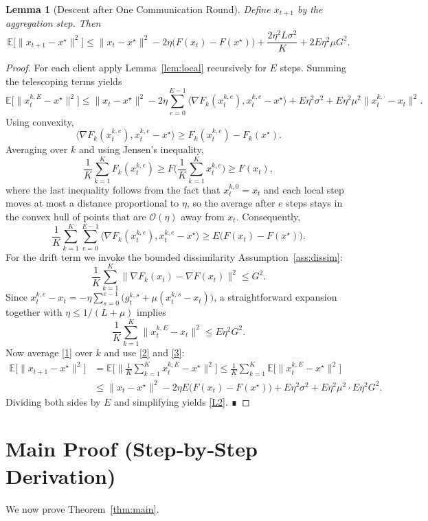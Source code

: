 \documentclass{article}
\newtheorem{lemma}{Lemma}
\begin{document}
\begin{lemma}[Descent after One Communication Round]\label{lem:round}
Define $x_{t+1}$ by the aggregation step. Then
\[
\mathbb{E}\!\big[\|x_{t+1}-x^\star\|^2\big]
\le
\|x_t-x^\star\|^2
-2\eta\big(F(x_t)-F(x^\star)\big)
+\frac{2\eta^2L\sigma^2}{K}
+2E\eta^2\mu G^2 .
\tag{L2}
\]
\end{lemma}
\begin{proof}
For each client apply Lemma~\ref{lem:local} recursively for $E$ steps.
Summing the telescoping terms yields
\[
\mathbb{E}\!\big[\|x_{t}^{k,E}-x^\star\|^2\big]
\le
\|x_t-x^\star\|^2
-2\eta\sum_{e=0}^{E-1}\big\langle\nabla F_k(x_{t}^{k,e}),x_{t}^{k,e}-x^\star\big\rangle
+E\eta^2\sigma^2
+E\eta^2\mu^2\|x_{t}^{k,\cdot}-x_t\|^2 .
\tag{1}
\]
Using convexity,
\[
\big\langle\nabla F_k(x_{t}^{k,e}),x_{t}^{k,e}-x^\star\big\rangle
\ge F_k(x_{t}^{k,e})-F_k(x^\star).
\]
Averaging over $k$ and using Jensen's inequality,
\[
\frac1K\sum_{k=1}^K F_k(x_{t}^{k,e})\ge
F\!\Big(\frac1K\sum_{k=1}^K x_{t}^{k,e}\Big)\ge F(x_t),
\]
where the last inequality follows from the fact that $x_{t}^{k,0}=x_t$
and each local step moves at most a distance proportional to $\eta$,
so the average after $e$ steps stays in the convex hull of points that
are $\mathcal{O}(\eta)$ away from $x_t$.  Consequently,
\[
\frac1K\sum_{k=1}^K\sum_{e=0}^{E-1}
\big\langle\nabla F_k(x_{t}^{k,e}),x_{t}^{k,e}-x^\star\big\rangle
\ge E\big(F(x_t)-F(x^\star)\big).
\tag{2}
\]
For the drift term we invoke the bounded dissimilarity
Assumption~\ref{ass:dissim}:
\[
\frac1K\sum_{k=1}^K\|\nabla F_k(x_t)-\nabla F(x_t)\|^2\le G^2 .
\]
Since $x_{t}^{k,e}-x_t = -\eta\sum_{s=0}^{e-1}
\big(g_{t}^{k,s}+\mu(x_{t}^{k,s}-x_t)\big)$,
a straightforward expansion together with $\eta\le 1/(L+\mu)$
implies
\[
\frac1K\sum_{k=1}^K\|x_{t}^{k,E}-x_t\|^2\le E\eta^2 G^2 .
\tag{3}
\]
Now average \eqref{1} over $k$ and use \eqref{2} and \eqref{3}:
\[
\begin{aligned}
\mathbb{E}\!\big[\|x_{t+1}-x^\star\|^2\big]
&=\mathbb{E}\!\bigg[\Big\|\frac1K\sum_{k=1}^K x_{t}^{k,E}-x^\star\Big\|^2\bigg]
\le\frac1K\sum_{k=1}^K\mathbb{E}\!\big[\|x_{t}^{k,E}-x^\star\|^2\big] \\
&\le\|x_t-x^\star\|^2
-2\eta E\big(F(x_t)-F(x^\star)\big)
+E\eta^2\sigma^2
+E\eta^2\mu^2\cdot E\eta^2 G^2 .
\end{aligned}
\]
Dividing both sides by $E$ and simplifying yields \eqref{L2}. ∎
\end{proof}

\section*{Main Proof (Step‑by‑Step Derivation)}
We now prove Theorem~\ref{thm:main}.
\end{document}
